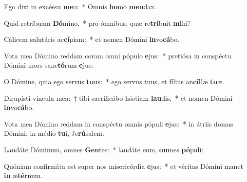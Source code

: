 \item Ego dixi in excéssu \textbf{me}o:~* Omnis \textbf{ho}mo \textbf{men}dax.
\item Quid retríbuam \textbf{Dó}mino,~* pro ómnibus, quæ re\textbf{trí}buit \textbf{mi}hi?
\item Cálicem salutáris ac\textbf{cí}piam:~* et nomen Dómini \textbf{in}vo\textbf{cá}bo.
\item Vota mea Dómino reddam coram omni pópulo \textbf{e}jus:~* pretiósa in conspéctu Dómini mors sanc\textbf{tó}rum \textbf{e}jus:
\item O Dómine, quia ego servus \textbf{tu}us:~* ego servus tuus, et fílius an\textbf{cíl}læ \textbf{tu}æ.
\item Dirupísti víncula mea:~† tibi sacrificábo hóstiam \textbf{lau}dis,~* et nomen Dómini \textbf{in}vo\textbf{cá}bo.
\item Vota mea Dómino reddam in conspéctu omnis pópuli \textbf{e}jus:~* in átriis domus Dómini, in médio \textbf{tu}i, Je\textbf{rú}salem.
\item Laudáte Dóminum, omnes \textbf{Gen}tes:~* laudáte eum, \textbf{om}nes \textbf{pó}puli:
\item Quóniam confirmáta est super nos misericórdia \textbf{e}jus:~* et véritas Dómini manet \textbf{in} æ\textbf{tér}num.
